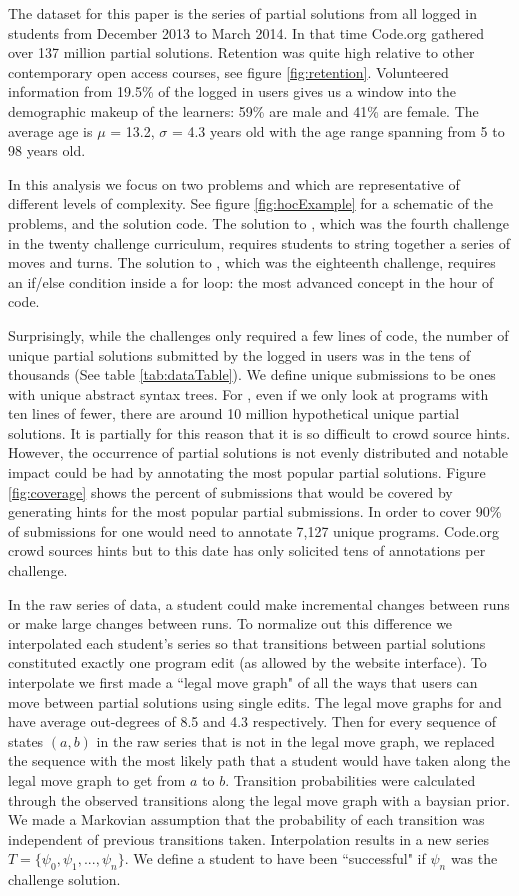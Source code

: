 The dataset for this paper is the series of partial solutions from all logged in students from December 2013 to March 2014. In that time Code.org gathered over 137 million partial solutions. Retention was quite high relative to other contemporary open access courses, see figure \ref{fig:retention}. Volunteered information from 19.5\% of the logged in users gives us a window into the demographic makeup of the learners: 59\% are male and 41\% are female. The average age is $\mu$ = 13.2, $\sigma$ = 4.3 years old with the age range spanning from 5 to 98 years old.


In this analysis we focus on two problems \Pa and \Pb which are representative of different levels of complexity. See figure \ref{fig:hocExample} for a schematic of the problems, and the solution code. The solution to \Pa, which was the fourth challenge in the twenty challenge curriculum, requires students to string together a series of moves and turns. The solution to \Pb, which was the eighteenth challenge, requires an if/else condition inside a for loop: the most advanced concept in the hour of code. 

Surprisingly, while the challenges only required a few lines of code, the number of unique partial solutions submitted by the logged in users was in the tens of thousands (See table \ref{tab:dataTable}). We define unique submissions to be ones with unique abstract syntax trees. For \Pb, even if we only look at programs with ten lines of fewer, there are around 10 million hypothetical unique partial solutions. It is partially for this reason that it is so difficult to crowd source hints. However, the occurrence of partial solutions is not evenly distributed and notable impact could be had by annotating the most popular partial solutions. Figure \ref{fig:coverage} shows the percent of submissions that would be covered by generating hints for the most popular partial submissions. In order to cover 90\% of submissions for \Pb one would need to annotate 7,127 unique programs. Code.org crowd sources hints but to this date has only solicited tens of annotations per challenge.

In the raw series of data, a student could make incremental changes between runs or make large changes between runs. To normalize out this difference we interpolated each student's series so that transitions between partial solutions constituted exactly one program edit (as allowed by the website interface). To interpolate we first made a ``legal move graph" of all the ways that users can move between partial solutions using single edits. The legal move graphs for \Pa and \Pb have average out-degrees of 8.5 and 4.3 respectively. Then for every sequence of states $(a, b)$ in the raw series that is not in the legal move graph, we replaced the sequence with the most likely path that a student would have taken along the legal move graph to get from $a$ to $b$. Transition probabilities were calculated through the observed transitions along the legal move graph with a baysian prior. We made a Markovian assumption that the probability of each transition was independent of previous transitions taken. Interpolation results in a new series $T = \{\psi_0, \psi_1, ... , \psi_n\}$. We define a student to have been ``successful" if $\psi_n$ was the challenge solution. 

